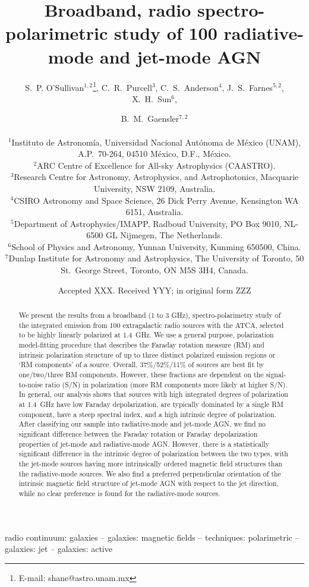 \documentclass{mnras}
\title[Broadband polarization of radio AGN]
{Broadband, radio spectro-polarimetric study of 100 radiative-mode and jet-mode AGN}
\author[O'Sullivan et al.]{S.~P. O'Sullivan$^{1,2}$\thanks{E-mail: shane@astro.unam.mx}, C.~R.~Purcell$^{3}$, C.~S.~Anderson$^{4}$, J.~S.~Farnes$^{5,2}$, X.~H.~Sun$^{6}$, \and B.~M.~Gaensler$^{7, 2}$ \\ \\
$^{1}$Instituto de Astronom\'ia, Universidad Nacional Aut\'onoma de M\'exico (UNAM), A.P.~70-264, 04510 M\'exico, D.F., M\'exico. \\
$^{2}$ARC Centre of Excellence for All-sky Astrophysics (CAASTRO). \\
$^{3}$Research Centre for Astronomy, Astrophysics, and Astrophotonics, Macquarie University, NSW 2109, Australia. \\
$^{4}$CSIRO Astronomy and Space Science, 26 Dick Perry Avenue, Kensington WA 6151, Australia. \\
$^{5}$Department of Astrophysics/IMAPP, Radboud University, PO Box 9010, NL-6500 GL Nijmegen, The Netherlands. \\
$^{6}$School of Physics and Astronomy, Yunnan University, Kunming 650500, China. \\
$^{7}$Dunlap Institute for Astronomy and Astrophysics, The University of Toronto, 50 St.~George Street, Toronto, ON M5S 3H4, Canada. \\
}
\date{Accepted XXX. Received YYY; in original form ZZZ}
\begin{document}
\label{firstpage}
\pagerange{\pageref{firstpage}--\pageref{lastpage}}
\maketitle

\begin{abstract}
We present the results from a broadband (1 to 3 GHz), spectro-polarimetry study of the integrated emission from 100 extragalactic radio sources with the ATCA, selected to be highly linearly polarized at 1.4~GHz. We use a general purpose, polarization model-fitting procedure that describes the Faraday rotation measure (RM) and intrinsic polarization structure of up to three distinct polarized emission regions or `RM components' of a source. %
Overall, 37\%/52\%/11\% of sources are best fit by one/two/three RM components. However, these fractions are dependent on the signal-to-noise ratio (S/N) in polarization (more RM components more likely at higher S/N). 
In general, our analysis shows that sources with high integrated degrees of polarization at 1.4~GHz have low Faraday depolarization, are typically dominated by a single RM component, have a steep spectral index, and a high intrinsic degree of polarization. 
After classifying our sample into radiative-mode and jet-mode AGN, we find no significant difference between the Faraday rotation or Faraday depolarization properties of jet-mode and radiative-mode AGN. However, there is a statistically significant difference in the intrinsic degree of polarization between the two types, with the jet-mode sources having more intrinsically ordered magnetic field structures than the radiative-mode sources. 
We also find a preferred perpendicular orientation of the intrinsic magnetic field structure of jet-mode AGN with respect to the jet direction, while no clear preference is found for the radiative-mode sources.  
\end{abstract}
\begin{keywords}
radio continuum: galaxies -- galaxies: magnetic fields -- techniques: polarimetric -- galaxies: jet -- galaxies: active
\end{keywords}


\end{document}
